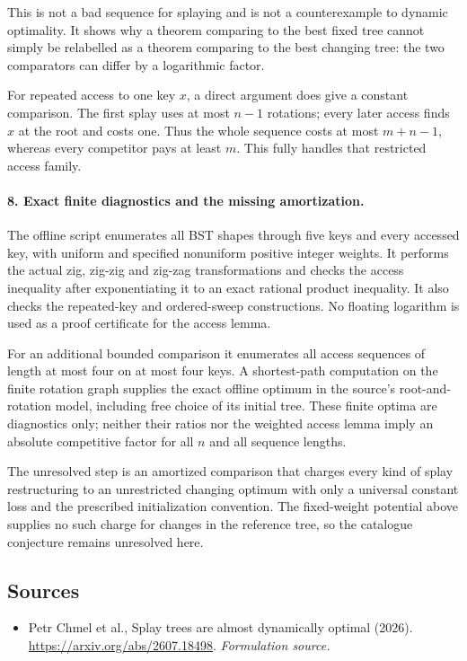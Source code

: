 \documentclass[11pt]{article}
\begin{document}
This is not a bad sequence for splaying and is not a counterexample to dynamic optimality. It shows why a theorem comparing to the best fixed tree cannot simply be relabelled as a theorem comparing to the best changing tree: the two comparators can differ by a logarithmic factor.

For repeated access to one key $x$, a direct argument does give a constant comparison. The first splay uses at most $n-1$ rotations; every later access finds $x$ at the root and costs one. Thus the whole sequence costs at most $m+n-1$, whereas every competitor pays at least $m$. This fully handles that restricted access family.

\paragraph{8. Exact finite diagnostics and the missing amortization.}
The offline script enumerates all BST shapes through five keys and every accessed key, with uniform and specified nonuniform positive integer weights. It performs the actual zig, zig-zig and zig-zag transformations and checks the access inequality after exponentiating it to an exact rational product inequality. It also checks the repeated-key and ordered-sweep constructions. No floating logarithm is used as a proof certificate for the access lemma.

For an additional bounded comparison it enumerates all access sequences of length at most four on at most four keys. A shortest-path computation on the finite rotation graph supplies the exact offline optimum in the source's root-and-rotation model, including free choice of its initial tree. These finite optima are diagnostics only; neither their ratios nor the weighted access lemma imply an absolute competitive factor for all $n$ and all sequence lengths.

The unresolved step is an amortized comparison that charges every kind of splay restructuring to an unrestricted changing optimum with only a universal constant loss and the prescribed initialization convention. The fixed-weight potential above supplies no such charge for changes in the reference tree, so the catalogue conjecture remains unresolved here.

\subsection{Sources}
\begin{itemize}
\item[S1]Petr Chmel et al., Splay trees are almost dynamically optimal (2026).
\url{https://arxiv.org/abs/2607.18498}.
\textit{Formulation source.}
\end{itemize}
\end{document}
